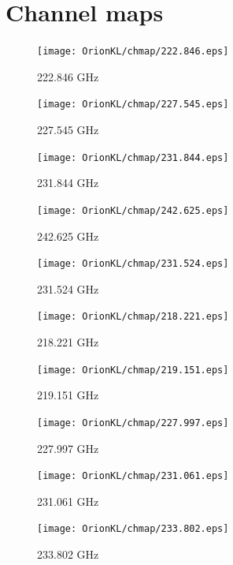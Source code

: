 \newpage

\section{Channel maps}

\begin{figure}[htbp]
  \centering
  \texttt{[image: OrionKL/chmap/222.846.eps]}
  \caption{222.846 GHz}
  \label{ap_ch_1}
\end{figure}

\begin{figure}[htbp]
  \centering
  \texttt{[image: OrionKL/chmap/227.545.eps]}
  \caption{227.545 GHz}
  \label{ap_ch_2}
\end{figure}

\begin{figure}[htbp]
  \centering
  \texttt{[image: OrionKL/chmap/231.844.eps]}
  \caption{231.844 GHz}
  \label{ap_ch_3}
\end{figure}

\begin{figure}[htbp]
  \centering
  \texttt{[image: OrionKL/chmap/242.625.eps]}
  \caption{242.625 GHz}
  \label{ap_ch_4}
\end{figure}

\begin{figure}[htbp]
  \centering
  \texttt{[image: OrionKL/chmap/231.524.eps]}
  \caption{231.524 GHz}
  \label{ap_ch_5}
\end{figure}

\begin{figure}[htbp]
  \centering
  \texttt{[image: OrionKL/chmap/218.221.eps]}
  \caption{218.221 GHz}
  \label{ap_ch_6}
\end{figure}

\begin{figure}[htbp]
  \centering
  \texttt{[image: OrionKL/chmap/219.151.eps]}
  \caption{219.151 GHz}
  \label{ap_ch_7}
\end{figure}

\begin{figure}[htbp]
  \centering
  \texttt{[image: OrionKL/chmap/227.997.eps]}
  \caption{227.997 GHz}
  \label{ap_ch_8}
\end{figure}

\begin{figure}[htbp]
  \centering
  \texttt{[image: OrionKL/chmap/231.061.eps]}
  \caption{231.061 GHz}
  \label{ap_ch_9}
\end{figure}

\begin{figure}[htbp]
  \centering
  \texttt{[image: OrionKL/chmap/233.802.eps]}
  \caption{233.802 GHz}
  \label{ap_ch_11}
\end{figure}


